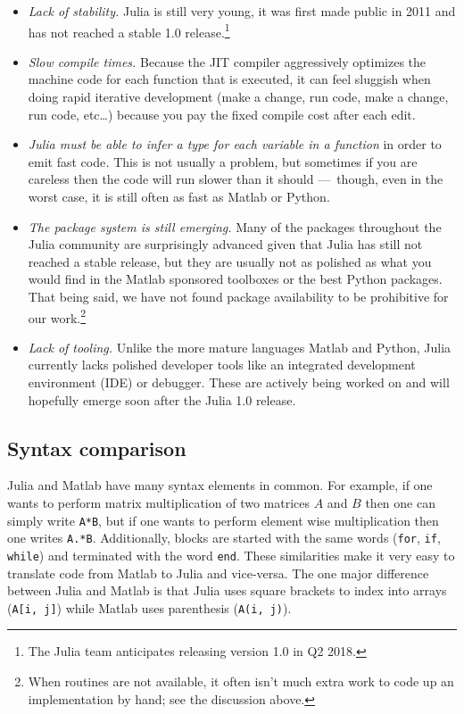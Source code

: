 \begin{itemize}

  \item \textit{Lack of stability.} Julia is still very young, it was first
  made public in 2011 and has not reached a stable 1.0 release.\footnote{ The
  Julia team anticipates releasing version 1.0 in Q2 2018.}

  \item \textit{Slow compile times.} Because the JIT compiler aggressively
  optimizes the machine code for each function that is executed, it can feel
  sluggish when doing rapid iterative development (make a change, run code,
  make a change, run code, etc\ldots ) because you pay the fixed compile cost
  after each edit.

  \item \textit{Julia must be able to infer a type for each variable in a
  function }in order to emit fast code\textit{.} This is not usually a problem,
  but sometimes if you are careless then the code will run slower than it
  should ---{\ though, even in the worst case, it is still often as fast as Matlab or Python}.

  \item \textit{The package system is still emerging.} Many of the packages
  throughout the Julia community are surprisingly advanced given that Julia has
  still not reached a stable release, but they are usually not as polished as
  what you would find in the Matlab sponsored toolboxes or the best Python
  packages. That being said, we have not found package availability to be
  prohibitive for our work.\footnote{ When routines are not available, it often
  isn't much extra work to code up an implementation by hand; see the
  discussion above.}

  \item \textit{Lack of tooling.} Unlike the more mature languages Matlab and
  Python, Julia currently lacks polished developer tools like an integrated
  development environment (IDE) or debugger. These are actively being worked on
  and will hopefully emerge soon after the Julia 1.0 release.

\end{itemize}

\subsection{Syntax comparison}

Julia and Matlab have many syntax elements in common. For example, if one wants
to perform matrix multiplication of two matrices $A$ and $B$ then one can
simply write \texttt{A*B}, but if one wants to perform element wise
multiplication then one writes \texttt{A.*B}. Additionally, blocks are started
with the same words (\texttt{for}, \texttt{if}, \texttt{while}) and terminated
with the word \texttt{end}. These similarities make it very easy to translate
code from Matlab to Julia and vice-versa. The one major difference between
Julia and Matlab is that Julia uses square brackets to index into arrays
(\texttt{A[i, j]}) while Matlab uses parenthesis (\texttt{A(i, j)}).


